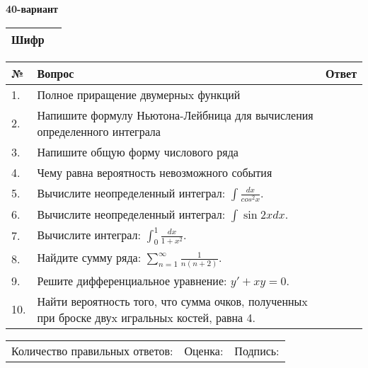\documentclass{article}
\begin{document}
  \egroup
  
  \newpage
  
  
  \textbf{40-вариант}\\
  
  \bgroup
  \def\arraystretch{1.6} %
  
  \begin{tabular}{|m{5.7cm}|m{9.5cm}|}
  \hline
  Шифр & \\
  \hline
  \end{tabular}
  
  \vspace{1cm}
  
  \begin{tabular}{|m{0.7cm}|m{10cm}|m{4cm}|}
  \hline
  № & Вопрос & Ответ \\
  \hline
  1. & Полное приращение двумерныx функций &  \\
  \hline
  2. & Напишите формулу Ньютона-Лейбница для вычисления определенного интеграла &  \\
  \hline
  3. & Напишите общую форму числового ряда &  \\
  \hline
  4. & Чему равна вероятность невозможного события &  \\
  \hline
  5. & Вычислите неопределенный интеграл: \(\int\frac{dx}{cos^{2}x}\). &  \\
  \hline
  6. & Вычислите неопределенный интеграл: \(\int{\sin{2x}dx}\). &  \\
  \hline
  7. & Вычислите интеграл: \(\int_{0}^{1}\frac{dx}{1 + x^{2}}\). &  \\
  \hline
  8. & Найдите сумму ряда: \(\sum_{n = 1}^{\infty}\frac{1}{n(n + 2)}\). &  \\
  \hline
  9. & Решите дифференциальное уравнение: \(y' + xy = 0\). &  \\
  \hline
  10. & Найти вероятность того, что сумма очков, полученныx при броске двуx игральныx костей, равна 4. &  \\
  \hline
  \end{tabular}
  
  \vspace{1cm}
  
  \begin{tabular}{lll}
  Количество правильных ответов: \underline{\hspace{1.5cm}} & 
  Оценка: \underline{\hspace{1.5cm}} & 
  Подпись: \underline{\hspace{2cm}} \\
  \end{tabular}
  
\end{document}
